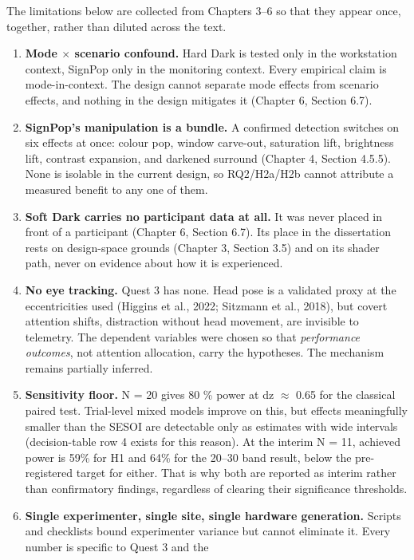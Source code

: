 The limitations below are collected from Chapters 3–6 so that they appear once, together, rather
than diluted across the text.

\begin{enumerate}
\item \textbf{Mode $\times$ scenario confound.} Hard Dark is tested only in the workstation context, SignPop only
   in the monitoring context. Every empirical claim is mode-in-context. The design cannot separate
   mode effects from scenario effects, and nothing in the design mitigates it (Chapter 6,
   Section 6.7).
\item \textbf{SignPop's manipulation is a bundle.} A confirmed detection switches on six effects at
   once: colour pop, window carve-out, saturation lift, brightness lift, contrast expansion, and
   darkened surround (Chapter 4, Section 4.5.5). None is isolable in the current design, so
   RQ2/H2a/H2b cannot attribute a measured benefit to any one of them.
\item \textbf{Soft Dark carries no participant data at all.} It was never placed in front of a
   participant (Chapter 6, Section 6.7). Its place in the dissertation rests on design-space
   grounds (Chapter 3, Section 3.5) and on its shader path, never on evidence about how it is
   experienced.
\item \textbf{No eye tracking.} Quest 3 has none. Head pose is a validated proxy at the eccentricities used
   (Higgins et al., 2022; Sitzmann et al., 2018), but covert attention shifts, distraction without
   head movement, are invisible to telemetry. The dependent variables were chosen so that
   \textit{performance outcomes}, not attention allocation, carry the hypotheses. The mechanism remains
   partially inferred.
\item \textbf{Sensitivity floor.} N = 20 gives 80 \% power at dz $\approx$ 0.65 for the classical paired test.
   Trial-level mixed models improve on this, but effects meaningfully smaller than the SESOI are
   detectable only as estimates with wide intervals (decision-table row 4 exists for this reason). At
   the interim N = 11, achieved power is 59\% for H1 and 64\% for the 20–30\textdegree{} band result,
   below the pre-registered target for either. That is why both are reported as interim rather than
   confirmatory findings, regardless of clearing their significance thresholds.
\item \textbf{Single experimenter, single site, single hardware generation.} Scripts and checklists bound
   experimenter variance but cannot eliminate it. Every number is specific to Quest 3 and the

\end{enumerate}
